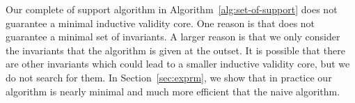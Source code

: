 Our complete of support algorithm in
Algorithm~\ref{alg:set-of-support} does not guarantee a minimal inductive validity core. One reason is that \reduceinv does not guarantee a minimal
set of invariants. A larger reason is that we only consider the
invariants that the algorithm is given at the outset. It is possible
that there are other invariants which could lead to a smaller inductive validity core, but we do not search for them. In Section~\ref{sec:exprm}, we
show that in practice our algorithm is nearly minimal and much more
efficient that the naive algorithm.


